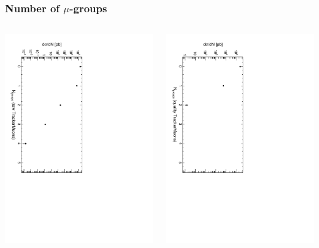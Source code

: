 \documentclass[compress]{beamer}
\begin{document}
\begin{frame}
\frametitle{Number of $\mu$-groups}

\begin{columns}
\includegraphics[height=\linewidth, angle=90]{groups_PlainTrackerMuonAny.pdf}

\includegraphics[height=\linewidth, angle=90]{groups_QualityTrackerMuonAny.pdf}


\end{columns}
\end{frame}
\end{document}
